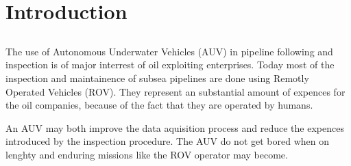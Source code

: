 \chapter{Introduction}

\section{}
	The use of Autonomous Underwater Vehicles (AUV) in pipeline following and inspection is of major interrest of oil exploiting enterprises. Today most of the inspection and maintainence of subsea pipelines are done using Remotly Operated Vehicles (ROV). They represent an substantial amount of expences for the oil companies, because of the fact that they are operated by humans. 
	
	An AUV may both improve the data aquisition process and reduce the expences introduced by the inspection procedure. The AUV do not get bored when on lenghty and enduring missions like the ROV operator may become. 
	
	